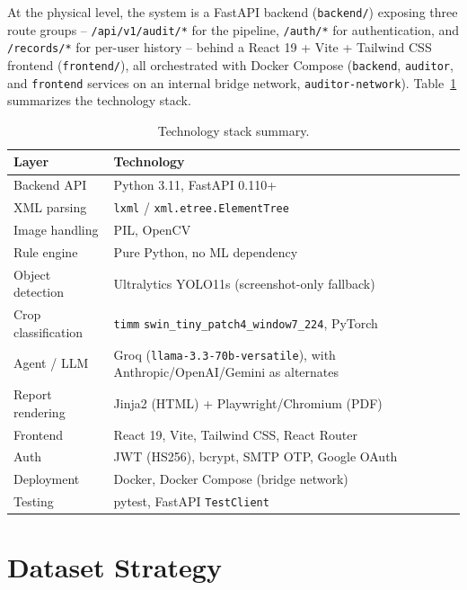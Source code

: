 \documentclass[10pt,conference]{IEEEtran}
\begin{document}
At the physical level, the system is a FastAPI backend (\texttt{backend/}) exposing three route groups -- \texttt{/api/v1/audit/*} for the pipeline, \texttt{/auth/*} for authentication, and \texttt{/records/*} for per-user history -- behind a React 19 + Vite + Tailwind CSS frontend (\texttt{frontend/}), all orchestrated with Docker Compose (\texttt{backend}, \texttt{auditor}, and \texttt{frontend} services on an internal bridge network, \texttt{auditor-network}). Table~\ref{tab:stack} summarizes the technology stack.

\begin{table}[!t]
\caption{Technology stack summary.}
\label{tab:stack}
\centering
\scriptsize
\begin{tabular}{@{}p{1.9cm}p{5.7cm}@{}}
\toprule
\textbf{Layer} & \textbf{Technology} \\
\midrule
Backend API & Python 3.11, FastAPI 0.110+ \\
XML parsing & \texttt{lxml} / \texttt{xml.etree.ElementTree} \\
Image handling & PIL, OpenCV \\
Rule engine & Pure Python, no ML dependency \\
Object detection & Ultralytics YOLO11s (screenshot-only fallback) \\
Crop classification & \texttt{timm} \texttt{swin\_tiny\_patch4\_window7\_224}, PyTorch \\
Agent / LLM & Groq (\texttt{llama-3.3-70b-versatile}), with Anthropic/OpenAI/Gemini as alternates \\
Report rendering & Jinja2 (HTML) + Playwright/Chromium (PDF) \\
Frontend & React 19, Vite, Tailwind CSS, React Router \\
Auth & JWT (HS256), bcrypt, SMTP OTP, Google OAuth \\
Deployment & Docker, Docker Compose (bridge network) \\
Testing & pytest, FastAPI \texttt{TestClient} \\
\bottomrule
\end{tabular}
\end{table}

\section{Dataset Strategy}
\end{document}
